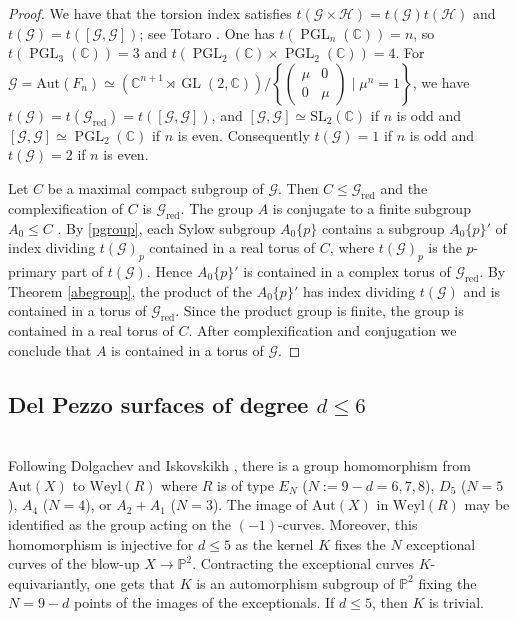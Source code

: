 \documentclass[a4paper,12pt,oneside]{amsart}
\numberwithin{equation}{section}
\theoremstyle{definition}
\theoremstyle{remark}
\newcommand{\PP}{\mathbb{P}}
\begin{document}
\begin{proof}
 We have that the torsion index satisfies $t(\mathcal{G}\times \mathcal{H})=t(\mathcal{G})t(\mathcal{H})$ and $t(\mathcal{G})=t([\mathcal{G},\mathcal{G}])$; see Totaro \cite{totaro}. One has $t(\operatorname{PGL}_n(\mathbb{C}))=n$, so $t(\operatorname{PGL}_3(\mathbb{C}))=3$ and $t(\operatorname{PGL}_2(\mathbb{C})\times\operatorname{PGL}_2(\mathbb{C}))=4$. For $\mathcal{G}=\mathrm{Aut}(F_n)\simeq\left(\mathbb{C}^{n+1} \rtimes \operatorname{GL}(2,\mathbb{C})\right)\Big/ \left\{ \begin{pmatrix}\mu & 0 \\ 0 & \mu\end{pmatrix} \mid \mu^n = 1 \right\}$, we have $t(\mathcal{G})=t(\mathcal{G}_{\mathrm{red}})=t([\mathcal{G},\mathcal{G}])$, and $[\mathcal{G},\mathcal{G}]\simeq \mathrm{SL}_2(\mathbb C)$ if $n$ is odd and $[\mathcal{G},\mathcal{G}]\simeq \operatorname{PGL}_2(\mathbb{C})$ if $n$ is even. Consequently $t(\mathcal{G})=1$ if $n$ is odd and $t(\mathcal{G})=2$ if $n$ is even.

Let $C$ be a maximal compact subgroup of $\mathcal{G}$. Then $C\leqslant \mathcal{G}_{\mathrm{red}}$ and the complexification of $C$ is $\mathcal{G}_{\mathrm{red}}$. The group $A$ is conjugate to a finite subgroup $A_0\leqslant C$ \cite[Chapter XV Theorem 3.1]{hoch}. By \ref{pgroup}, each Sylow subgroup $A_{0}\{p\}$ contains a subgroup $A_{0}\{p\}'$ of index dividing $t(\mathcal{G})_p$ contained in a real torus of $C$, where $t(\mathcal{G})_p$ is the $p$-primary part of $t(\mathcal{G})$. Hence $A_{0}\{p\}'$ is contained in a complex torus of $\mathcal{G}_{\mathrm{red}}$. By Theorem \ref{abegroup}, the product of the $A_{0}\{p\}'$ has index dividing $t(\mathcal{G})$ and is contained in a torus of $\mathcal{G}_{\mathrm{red}}$. Since the product group is finite, the group is contained in a real torus of $C$. After complexification and conjugation we conclude that $A$ is contained in a torus of $\mathcal{G}$.
\end{proof}



\subsection{Del Pezzo surfaces of degree $d \leq 6$}\mbox{}\\
Following Dolgachev and Iskovskikh \cite[Section 6.1]{dolgachev2009finitesubgroupsplanecremona}, there is a group homomorphism from $\mathrm{Aut}(X)$ to $\mathrm{Weyl}(R)$ where $R$ is of type $E_N$ ($N := 9-d= 6, 7, 8$), $D_5$ ($N = 5$), $A_4$ ($N = 4$), or $A_2 + A_1$ ($N = 3$). The image of $\mathrm{Aut}(X)$ in $\mathrm{Weyl}(R)$ may be identified as the group acting on the $(-1)$-curves. Moreover, this homomorphism is injective for $d \leq 5$ as the kernel $K$ fixes the $N$ exceptional curves of the blow-up $X\to \PP^2$. Contracting the exceptional curves $K$-equivariantly, one gets that $K$ is an automorphism subgroup of $\mathbb P^2$ fixing the $N = 9-d$ points of the images of the exceptionals. If $d\leq 5$, then $K$ is trivial.
\end{document}
